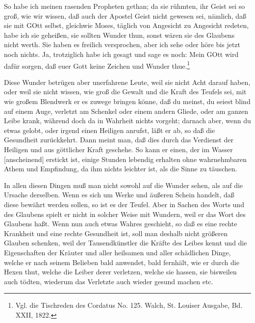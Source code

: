 So habe ich meinen rasenden Propheten gethan; da sie rühmten, ihr Geist sei so groß, wie wir wissen, daß auch der Apostel Geist nicht gewesen sei, nämlich, daß sie mit GOtt selbst, gleichwie Moses, täglich von Angesicht zu Angesicht redeten, habe ich sie geheißen, sie sollten Wunder thun, sonst wären sie des Glaubens nicht werth. Sie haben es freilich versprochen, aber ich sehe oder höre bis jetzt noch nichts. Ja, trotziglich habe ich gesagt und sage es noch: Mein GOtt wird dafür sorgen, daß euer Gott keine Zeichen und Wunder thue.\footnote{Vgl. die Tischreden des Cordatus No. 125. Walch, St. Louiser Ausgabe, Bd. XXII, 1822.}

Diese Wunder betrügen aber unerfahrene Leute, weil sie nicht Acht darauf haben, oder weil sie nicht wissen, wie groß die Gewalt und die Kraft des Teufels sei, mit wie großem Blendwerk er es zuwege bringen könne, daß du meinst, du seiest blind auf einem Auge, verletzt am Schenkel oder einem andern Gliede, oder am ganzen Leibe krank, während doch da in Wahrheit
nichts vorgeht; darnach aber, wenn du etwas gelobt, oder irgend einen Heiligen anrufst, läßt er ab, so daß die Gesundheit zurückkehrt. Dann meint man, daß dies durch das Verdienst der Heiligen und aus göttlicher Kraft geschehe. So kann er einen, der im Wasser [anscheinend] erstickt ist, einige Stunden lebendig erhalten ohne wahrnehmbaren Athem und Empfindung, da ihm nichts leichter ist, als die Sinne zu täuschen.

In allen diesen Dingen muß man nicht sowohl auf die Wunder sehen, als auf die Ursache derselben. Wenn es sich um Werke und äußeren Schein handelt, daß diese bewährt werden sollen, so ist es der Teufel. Aber in Sachen des Worts und des Glaubens spielt er nicht in solcher Weise mit Wundern, weil er das Wort des Glaubens haßt. Wenn nun auch etwas Wahres geschieht, so daß es eine rechte Krankheit und eine rechte Gesundheit ist, soll man deshalb nicht größeren Glauben schenken, weil der Tausendkünstler die Kräfte des Leibes kennt und die Eigenschaften der Kräuter und aller heilsamen und aller schädlichen Dinge, welche er nach seinem Belieben bald anwendet, bald fernhält, wie er durch die Hexen thut, welche die Leiber derer verletzen, welche sie hassen, sie bisweilen auch tödten, wiederum das Verletzte auch wieder gesund machen etc.

